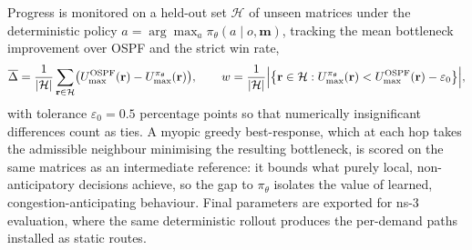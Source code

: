 Progress is monitored on a held-out set $\mathcal{H}$ of unseen matrices under the deterministic
policy $a = \arg\max_a \pi_\theta(a\mid o,\mathbf{m})$, tracking the mean bottleneck improvement
over OSPF and the strict win rate,
\begin{equation}
\overline{\Delta} = \frac{1}{|\mathcal{H}|}\sum_{\mathbf{r}\in\mathcal{H}}
\bigl(U^{\mathrm{OSPF}}_{\max}(\mathbf{r}) - U^{\pi_\theta}_{\max}(\mathbf{r})\bigr),
\qquad
w = \frac{1}{|\mathcal{H}|}\Bigl|\bigl\{\mathbf{r}\in\mathcal{H} :
U^{\pi_\theta}_{\max}(\mathbf{r}) < U^{\mathrm{OSPF}}_{\max}(\mathbf{r}) - \varepsilon_0\bigr\}\Bigr|,
\end{equation}
with tolerance $\varepsilon_0 = 0.5$ percentage points so that numerically insignificant
differences count as ties. A myopic greedy best-response, which at each hop takes the admissible
neighbour minimising the resulting bottleneck, is scored on the same matrices as an intermediate
reference: it bounds what purely local, non-anticipatory decisions achieve, so the gap to
$\pi_\theta$ isolates the value of learned, congestion-anticipating behaviour. Final parameters
are exported for \mbox{ns-3} evaluation, where the same deterministic rollout produces the
per-demand paths installed as static routes.
